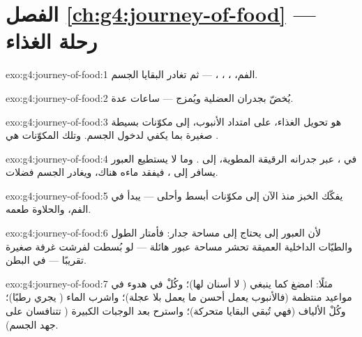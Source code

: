 \section*{الفصل \ref{ch:g4:journey-of-food} --- رحلة الغذاء}

\begin{solution}{exo:g4:journey-of-food:1}
الفم، ، ، ،  --- ثم تغادر
البقايا الجسم.
\end{solution}

\begin{solution}{exo:g4:journey-of-food:2}
يُخضّ بجدران  العضلية ويُمزج  --- ساعات
عدة.
\end{solution}

\begin{solution}{exo:g4:journey-of-food:3}
 هو تحويل الغذاء، على امتداد الأنبوب، إلى مكوّنات بسيطة صغيرة
بما يكفي لدخول الجسم. وتلك المكوّنات هي .
\end{solution}

\begin{solution}{exo:g4:journey-of-food:4}
في ، عبر جدرانه الرقيقة المطوية، إلى . وما لا
يستطيع العبور يسافر إلى ، فيفقد ماءه هناك، ويغادر
الجسم فضلات.
\end{solution}

\begin{solution}{exo:g4:journey-of-food:5}
 يفكّك الخبز منذ الآن إلى مكوّنات أبسط وأحلى ---  يبدأ
في الفم، والحلاوة طعمه.
\end{solution}

\begin{solution}{exo:g4:journey-of-food:6}
لأن العبور إلى  يحتاج إلى مساحة جدار: فأمتار الطول والطيّات
الداخلية العميقة تحشر مساحة عبور هائلة --- لو بُسطت لفرشت غرفة
صغيرة تقريبًا --- في البطن.
\end{solution}

\begin{solution}{exo:g4:journey-of-food:7}
مثلًا: امضغ كما ينبغي ( لا أسنان لها)؛ وكُلْ في هدوء في
مواعيد منتظمة (فالأنبوب يعمل أحسن ما يعمل بلا عجلة)؛ واشرب الماء
( يجري رطبًا)؛ وكُلْ الألياف (فهي تُبقي البقايا متحركة)؛
واسترح بعد الوجبات الكبيرة (  تتنافسان على جهد
الجسم).
\end{solution}


